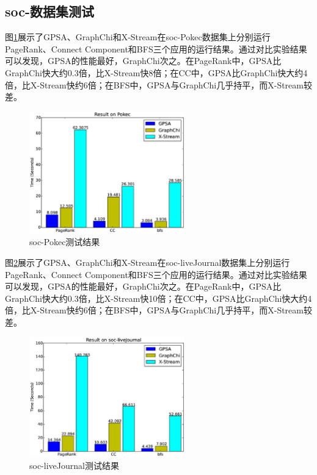 

\subsection{soc-数据集测试}
图\ref{res:pokec}展示了GPSA、GraphChi和X-Stream在soc-Pokec数据集上分别运行PageRank、Connect Component和BFS三个应用的运行结果。通过对比实验结果可以发现，GPSA的性能最好，GraphChi次之。在PageRank中，GPSA比GraphChi快大约0.3倍，比X-Stream快8倍；在CC中，GPSA比GraphChi快大约4倍，比X-Stream快约6倍；在BFS中，GPSA与GraphChi几乎持平，而X-Stream较差。

\begin{figure}[htbp]
\centering
\includegraphics[width=0.6\textwidth,scale=0.8]{myfigures/pokectime2.eps}
\caption{soc-Pokec测试结果}
\label{res:pokec}
\end{figure}


图\ref{res:journal}展示了GPSA、GraphChi和X-Stream在soc-liveJournal数据集上分别运行PageRank、Connect Component和BFS三个应用的运行结果。通过对比实验结果可以发现，GPSA的性能最好，GraphChi次之。在PageRank中，GPSA比GraphChi快大约0.3倍，比X-Stream快10倍；在CC中，GPSA比GraphChi快大约4倍，比X-Stream快约6倍；在BFS中，GPSA与GraphChi几乎持平，而X-Stream较差。

\begin{figure}[htbp]
\centering
\includegraphics[width=0.6\textwidth,scale=0.8]{myfigures/journaltime2.eps}
\caption{soc-liveJournal测试结果}
\label{res:journal}
\end{figure}

